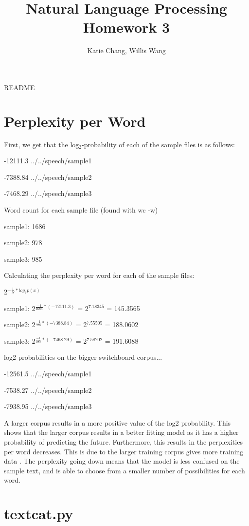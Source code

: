\documentclass[12pt, letterpaper]{article}
\title{Natural Language Processing Homework 3}
\author{Katie Chang, Willis Wang}
\begin{document}
\maketitle

README

\section{Perplexity per Word}
First, we get that the log$_{2}$-probability of each of the sample files is as follows:

-12111.3	../../speech/sample1

-7388.84	../../speech/sample2

-7468.29	../../speech/sample3

Word count for each sample file (found with wc -w)

sample1: 1686

sample2: 978
     
sample3: 985

Calculating the perplexity per word for each of the sample files:

2$^{-\frac{1}{N}*log_{2}p(x)}$

sample1: 2$^{\frac{-1}{1686} * (-12111.3)}$ = 2$^{7.18345}$ = 145.3565

sample2: 2$^{\frac{-1}{978} * (-7388.84)}$ = 2$^{7.55505}$ = 188.0602

sample3: 2$^{\frac{-1}{985} * (-7468.29)}$ = 2$^{7.58202}$ = 191.6088

log2 probabilities on the bigger switchboard corpus...

-12561.5	../../speech/sample1

-7538.27	../../speech/sample2

-7938.95	../../speech/sample3

A larger corpus results in a more positive value of the log2 probability. This shows that the larger corpus results in a better fitting model as it has a higher probability of predicting the future. Furthermore, this results in the perplexities per word decreases. This is due to the larger training corpus gives more training data . The perplexity going down means that the model is less confused on the sample text, and is able to choose from a smaller number of possibilities for each word.

\section{textcat.py}
\end{document}
